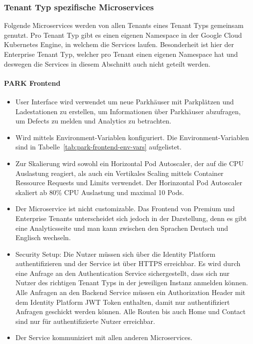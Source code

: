 \subsubsection{Tenant Typ spezifische Microservices}
Folgende Microservices werden von allen Tenants eines Tenant Typs gemeinsam genutzt. Pro Tenant Typ gibt es einen eigenen Namespace in der Google Cloud Kubernetes Engine, in welchem die Services laufen. Besonderheit ist hier der Enterprise Tenant Typ, welcher pro Tenant einen eigenen Namespace hat und deswegen die Services in diesem Abschnitt auch nicht geteilt werden.

\paragraph{PARK Frontend}
\begin{itemize}
	\item User Interface wird verwendet um neue Parkhäuser mit Parkplätzen und Ladestationen zu erstellen, um Informationen über Parkhäuser abzufragen, um Defects zu melden und Analytics zu betrachten.
	\item Wird mittels Environment-Variablen konfiguriert. Die Environment-Variablen sind in Tabelle~\ref{tab:park-frontend-env-vars} aufgelistet.
	\item Zur Skalierung wird sowohl ein Horizontal Pod Autoscaler, der auf die CPU Auslastung reagiert, als auch ein Vertikales Scaling mittels Container Ressource Requests und Limits verwendet.
  Der Horinzontal Pod Autoscaler skaliert ab 80\% CPU Auslastung und maximal 10 Pods.
	\item Der Microservice ist nicht customizable. Das Frontend von Premium und Enterprise Tenants unterscheidet sich jedoch in der Darstellung, denn es gibt eine Analyticsseite und man kann zwischen den Sprachen Deutsch und Englisch wechseln.
	\item Security Setup: Die Nutzer müssen sich über die Identity Platform authentifizieren und der Service ist über HTTPS erreichbar. Es wird durch eine Anfrage an den Authentication Service sichergestellt, dass sich nur Nutzer des richtigen Tenant Typs in der jeweiligen Instanz anmelden können. Alle Anfragen an den Backend Service müssen ein Authorization Header mit dem Identity Platform JWT Token enthalten, damit nur authentifiziert Anfragen geschickt werden können. Alle Routen bis auch Home und Contact sind nur für authentifizierte Nutzer erreichbar.
	\item Der Service kommuniziert mit allen anderen Microservices.
\end{itemize}

